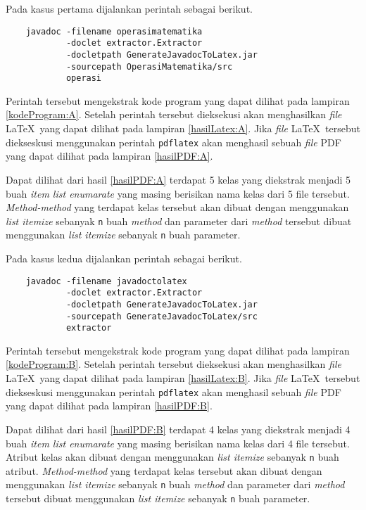 Pada kasus pertama dijalankan perintah sebagai berikut.

\begin{verbatim}
	javadoc -filename operasimatematika
	        -doclet extractor.Extractor
	        -docletpath GenerateJavadocToLatex.jar
	        -sourcepath OperasiMatematika/src
	        operasi
\end{verbatim}

Perintah tersebut mengekstrak kode program yang dapat dilihat pada lampiran \ref{kodeProgram:A}. Setelah perintah tersebut dieksekusi akan menghasilkan {\it file} \LaTeX\ yang dapat dilihat pada lampiran \ref{hasilLatex:A}. Jika {\it file} \LaTeX\ tersebut diekseskusi menggunakan perintah {\tt pdflatex} akan menghasil sebuah {\it file} PDF yang dapat dilihat pada lampiran \ref{hasilPDF:A}.

Dapat dilihat dari hasil \ref{hasilPDF:A} terdapat 5 kelas yang diekstrak menjadi 5 buah {\it item list enumarate} yang masing berisikan nama kelas dari 5 file tersebut. {\it Method-method} yang terdapat kelas tersebut akan dibuat dengan menggunakan {\it list itemize} sebanyak {\tt n} buah {\it method} dan parameter dari {\it method} tersebut dibuat menggunakan {\it list itemize} sebanyak {\tt n} buah parameter.

Pada kasus kedua dijalankan perintah sebagai berikut.

\begin{verbatim}
	javadoc -filename javadoctolatex
	        -doclet extractor.Extractor
	        -docletpath GenerateJavadocToLatex.jar
	        -sourcepath GenerateJavadocToLatex/src
	        extractor
\end{verbatim}

Perintah tersebut mengekstrak kode program yang dapat dilihat pada lampiran \ref{kodeProgram:B}. Setelah perintah tersebut dieksekusi akan menghasilkan {\it file} \LaTeX\ yang dapat dilihat pada lampiran \ref{hasilLatex:B}. Jika {\it file} \LaTeX\ tersebut diekseskusi menggunakan perintah {\tt pdflatex} akan menghasil sebuah {\it file} PDF yang dapat dilihat pada lampiran \ref{hasilPDF:B}.

Dapat dilihat dari hasil \ref{hasilPDF:B} terdapat 4 kelas yang diekstrak menjadi 4 buah {\it item list enumarate} yang masing berisikan nama kelas dari 4 file tersebut. Atribut kelas akan dibuat dengan menggunakan {\it list itemize} sebanyak {\tt n} buah atribut. {\it Method-method} yang terdapat kelas tersebut akan dibuat dengan menggunakan {\it list itemize} sebanyak {\tt n} buah {\it method} dan parameter dari {\it method} tersebut dibuat menggunakan {\it list itemize} sebanyak {\tt n} buah parameter.

